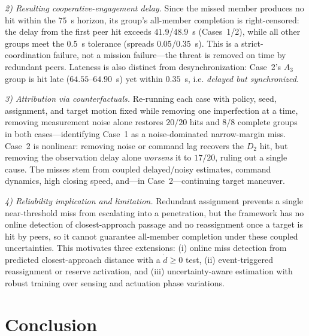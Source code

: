 \documentclass[lettersize,journal]{IEEEtran}
\newcommand{\hladd}[1]{{\color{blue}#1}}
\begin{document}
\hladd{\emph{2) Resulting cooperative-engagement delay.} Since the missed member produces no hit
within the $75$~s horizon, its group's all-member completion is right-censored: the delay from the
first peer hit exceeds $41.9$/$48.9$~s (Cases~1/2), while all other groups meet the $0.5$~s tolerance
(spreads $0.05$/$0.35$~s). This is a strict-coordination failure, not a mission failure---the threat is
removed on time by redundant peers. Lateness is also distinct from desynchronization: Case~2's $A_3$
group is hit late ($64.55$--$64.90$~s) yet within $0.35$~s, i.e. \emph{delayed but synchronized}.}

\hladd{\emph{3) Attribution via counterfactuals.} Re-running each case with policy, seed, assignment,
and target motion fixed while removing one imperfection at a time, removing measurement noise alone
restores $20/20$ hits and $8/8$ complete groups in both cases---identifying Case~1 as a noise-dominated
narrow-margin miss. Case~2 is nonlinear: removing noise or command lag recovers the $D_2$ hit, but
removing the observation delay alone \emph{worsens} it to $17/20$, ruling out a single cause. The
misses stem from coupled delayed/noisy estimates, command dynamics, high closing speed, and---in
Case~2---continuing target maneuver.}

\hladd{\emph{4) Reliability implication and limitation.} Redundant assignment prevents a single
near-threshold miss from escalating into a penetration, but the framework has no online detection of
closest-approach passage and no reassignment once a target is hit by peers, so it cannot guarantee
all-member completion under these coupled uncertainties. This motivates three extensions: (i) online
miss detection from predicted closest-approach distance with a $\dot d\!\ge\!0$ test, (ii)
event-triggered reassignment or reserve activation, and (iii) uncertainty-aware estimation with robust
training over sensing and actuation phase variations.}



\section{Conclusion}
\label{sec:conclusion}
\end{document}
